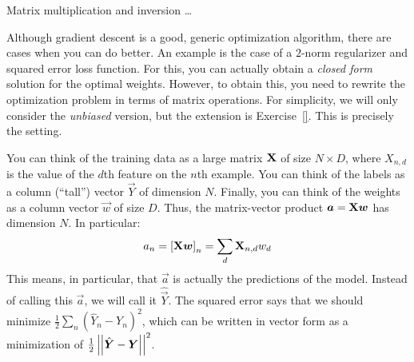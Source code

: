 \begin{mathreview}{Matrix multiplication and inversion}
  \dots
\end{mathreview}

Although gradient descent is a good, generic optimization algorithm,
there are cases when you can do better.  An example is the case of a
$2$-norm regularizer and squared error loss function.  For this, you
can actually obtain a \emph{closed form} solution for the optimal
weights.  However, to obtain this, you need to rewrite the
optimization problem in terms of matrix operations.  For simplicity,
we will only consider the \emph{unbiased} version, but the extension
is Exercise~\ref{}.  This is precisely the 
setting.

You can think of the training data as a large matrix $\text{\bf X}$ of size
$N \times D$, where $X_{n,d}$ is the value of the $d$th feature on the
$n$th example.  You can think of the labels as a column (``tall'')
vector $\vec Y$ of dimension $N$.  Finally, you can think of the
weights as a column vector $\vec w$ of size $D$.  Thus, the
matrix-vector product $\boldsymbol{a} = \text{\bf X} \boldsymbol{w}$ has dimension $N$.  In
particular:
%
\begin{equation}
a_n
= \left[ \text{\bf X} \boldsymbol{w} \right]_n 
= \sum_d \text{\bf X}_{n,d} w_d
\end{equation}
%
This means, in particular, that $\vec a$ is actually the predictions
of the model.  Instead of calling this $\vec a$, we will call it
$\hat{\vec Y}$.  The squared error says that we should minimize $\frac 1
2 \sum_n (\hat Y_n - Y_n)^2$, which can be written in vector form as a
minimization of $\frac 1 2 \left\vert\left\vert \hat{\boldsymbol{Y}} - \boldsymbol{Y} \right\vert\right\vert^2$.


